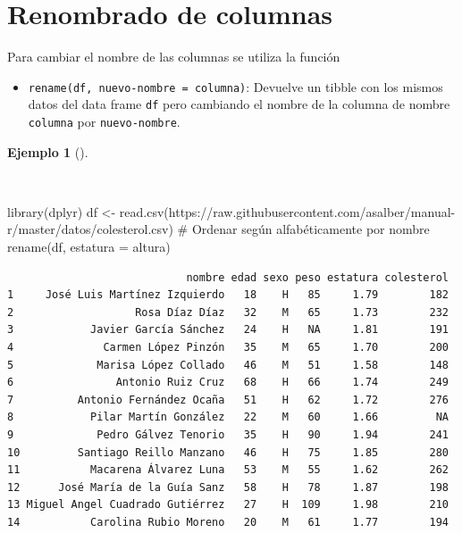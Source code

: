 \documentclass[
  a4paper,
]{scrreport}
\newenvironment{Shaded}{\begin{snugshade}}{\end{snugshade}}
\newcommand{\AttributeTok}[1]{\textcolor[rgb]{0.40,0.45,0.13}{#1}}
\newcommand{\CommentTok}[1]{\textcolor[rgb]{0.37,0.37,0.37}{#1}}
\newcommand{\FunctionTok}[1]{\textcolor[rgb]{0.28,0.35,0.67}{#1}}
\newcommand{\NormalTok}[1]{\textcolor[rgb]{0.00,0.23,0.31}{#1}}
\newcommand{\OtherTok}[1]{\textcolor[rgb]{0.00,0.23,0.31}{#1}}
\newcommand{\StringTok}[1]{\textcolor[rgb]{0.13,0.47,0.30}{#1}}
\providecommand{\tightlist}{%
  \setlength{\itemsep}{0pt}\setlength{\parskip}{0pt}}\usepackage{longtable,booktabs,array}
\theoremstyle{definition}
\theoremstyle{definition}
\newtheorem{example}{Ejemplo}[chapter]
\theoremstyle{remark}
\begin{document}
\section{Renombrado de columnas}\label{renombrado-de-columnas}

Para cambiar el nombre de las columnas se utiliza la función

\begin{itemize}
\tightlist
\item
  \texttt{rename(df,\ nuevo-nombre\ =\ columna)}: Devuelve un tibble con
  los mismos datos del data frame \texttt{df} pero cambiando el nombre
  de la columna de nombre \texttt{columna} por \texttt{nuevo-nombre}.
\end{itemize}

\begin{example}[]\protect\hypertarget{exm-rename}{}\label{exm-rename}

~

\begin{Shaded}
\begin{Highlighting}[]
\FunctionTok{library}\NormalTok{(dplyr)}
\NormalTok{df }\OtherTok{\textless{}{-}} \FunctionTok{read.csv}\NormalTok{(}\StringTok{\textquotesingle{}https://raw.githubusercontent.com/asalber/manual{-}r/master/datos/colesterol.csv\textquotesingle{}}\NormalTok{)}
\CommentTok{\# Ordenar según alfabéticamente por nombre}
\FunctionTok{rename}\NormalTok{(df, }\AttributeTok{estatura =}\NormalTok{ altura)}
\end{Highlighting}
\end{Shaded}

\begin{verbatim}
                            nombre edad sexo peso estatura colesterol
1     José Luis Martínez Izquierdo   18    H   85     1.79        182
2                   Rosa Díaz Díaz   32    M   65     1.73        232
3            Javier García Sánchez   24    H   NA     1.81        191
4              Carmen López Pinzón   35    M   65     1.70        200
5             Marisa López Collado   46    M   51     1.58        148
6                Antonio Ruiz Cruz   68    H   66     1.74        249
7          Antonio Fernández Ocaña   51    H   62     1.72        276
8            Pilar Martín González   22    M   60     1.66         NA
9             Pedro Gálvez Tenorio   35    H   90     1.94        241
10         Santiago Reillo Manzano   46    H   75     1.85        280
11           Macarena Álvarez Luna   53    M   55     1.62        262
12      José María de la Guía Sanz   58    H   78     1.87        198
13 Miguel Angel Cuadrado Gutiérrez   27    H  109     1.98        210
14           Carolina Rubio Moreno   20    M   61     1.77        194
\end{verbatim}

\end{example}
\end{document}
